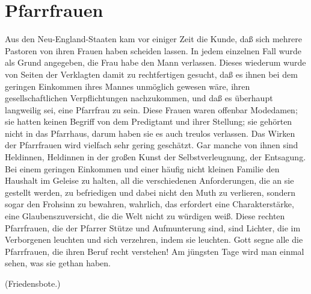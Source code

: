 \chapter{Pfarrfrauen}

Aus den Neu-England-Staaten kam vor einiger Zeit die Kunde, daß sich mehrere Pastoren von ihren Frauen haben scheiden lassen. In jedem einzelnen Fall wurde als Grund angegeben, die Frau habe den Mann verlassen. Dieses wiederum wurde von Seiten der Verklagten damit zu rechtfertigen gesucht, daß es ihnen bei dem geringen Einkommen ihres Mannes unmöglich gewesen wäre, ihren gesellschaftlichen Verpflichtungen nachzukommen, und daß es überhaupt langweilig sei, eine Pfarrfrau zu sein. Diese Frauen waren offenbar Modedamen; sie hatten keinen Begriff von dem Predigtamt und ihrer Stellung; sie gehörten nicht in das Pfarrhaus, darum haben sie es auch treulos verlassen. Das Wirken der Pfarrfrauen wird vielfach sehr gering geschätzt. Gar manche von ihnen sind Heldinnen, Heldinnen in der großen Kunst der Selbstverleugnung, der Entsagung. Bei einem geringen Einkommen und einer häufig nicht kleinen Familie den Haushalt im Geleise zu halten, all die verschiedenen Anforderungen, die an sie gestellt werden, zu befriedigen und dabei nicht den Muth zu verlieren, sondern sogar den Frohsinn zu bewahren, wahrlich, das erfordert eine Charakterstärke, eine Glaubenszuversicht, die die Welt nicht zu würdigen weiß. Diese rechten Pfarrfrauen, die der Pfarrer Stütze und Aufmunterung sind, sind Lichter, die im Verborgenen leuchten und sich verzehren, indem sie leuchten. Gott segne alle die Pfarrfrauen, die ihren Beruf recht verstehen! Am jüngsten Tage wird man einmal sehen, was sie gethan haben.

(Friedensbote.)
